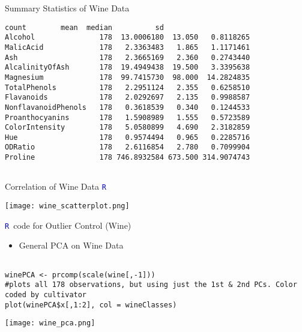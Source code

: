 \documentclass[notes=show]{beamer}
\newcommand \bit  {\begin{itemize}}
\newcommand \eit  {\end{itemize}}
\newcommand{\textR}[1]{\textcolor{blue}{\texttt{#1}}}
\newcommand{\R}{\textR{R}}
\begin{document}
\begin{frame}[fragile]{Summary Statistics of Wine Data}

\begin{Verbatim}[formatcom=\color{blue}]
                    count        mean  median          sd
Alcohol               178  13.0006180  13.050   0.8118265
MalicAcid             178   2.3363483   1.865   1.1171461
Ash                   178   2.3665169   2.360   0.2743440
AlcalinityOfAsh       178  19.4949438  19.500   3.3395638
Magnesium             178  99.7415730  98.000  14.2824835
TotalPhenols          178   2.2951124   2.355   0.6258510
Flavanoids            178   2.0292697   2.135   0.9988587
NonflavanoidPhenols   178   0.3618539   0.340   0.1244533
Proanthocyanins       178   1.5908989   1.555   0.5723589
ColorIntensity        178   5.0580899   4.690   2.3182859
Hue                   178   0.9574494   0.965   0.2285716
ODRatio               178   2.6116854   2.780   0.7099904
Proline               178 746.8932584 673.500 314.9074743
    
\end{Verbatim}
    
\end{frame}

\begin{frame}[fragile]{Correlation of Wine Data \R}

\hspace{-.5cm}
\texttt{[image: wine\_scatterplot.png]}

\end{frame}



\begin{frame}[fragile]{\R \, code for Outlier Control (Wine)}

\bit
\item General PCA on Wine Data
\eit
\vspace{.25cm}
{\tiny
\begin{Verbatim}[formatcom=\color{blue}]

winePCA <- prcomp(scale(wine[,-1]))
#plots all 178 observations, but using just the 1st & 2nd PCs. Color coded by cultivator
plot(winePCA$x[,1:2], col = wineClasses)
\end{Verbatim}


\texttt{[image: wine\_pca.png]}
}



 
\end{frame}
\end{document}
